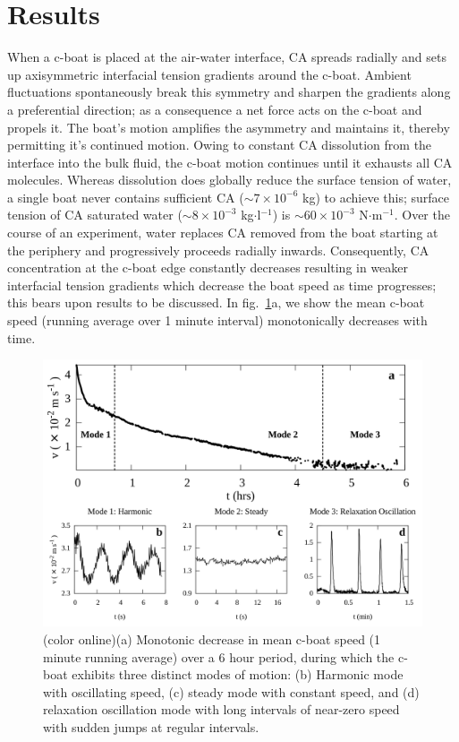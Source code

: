 \documentclass[journal=langd5, manuscript=article, layout=twocolumn]{achemso}
\begin{document}
\section{Results}
\label{resultsec}
When a c-boat is placed at the air-water interface, CA spreads radially and sets up axisymmetric interfacial tension gradients around the c-boat. Ambient fluctuations spontaneously break this symmetry and sharpen the gradients along a preferential direction; as a consequence a net force acts on the c-boat and propels it. The boat's motion amplifies the asymmetry and maintains it, thereby permitting it's continued motion. Owing to constant CA dissolution from the interface into the bulk fluid, the c-boat motion continues until it exhausts all CA molecules. Whereas dissolution does globally reduce the surface tension of water, a single boat never contains sufficient CA ($\sim 7 \times 10^{-6}$ kg) to achieve this; surface tension of CA saturated water ($\sim 8 \times 10^{-3}$ kg$\cdot$l$^{-1}$) is $\sim 60\times 10^{-3}$ N$\cdot$m$^{-1}$. Over the course of an experiment, water replaces CA removed from the boat starting at the periphery and progressively proceeds radially inwards. Consequently, CA concentration at the c-boat edge constantly decreases resulting in weaker interfacial tension gradients which decrease the boat speed as time progresses; this bears upon results to be discussed. In fig.~\ref{fig2}a, we show the mean c-boat speed (running average over 1 minute interval) monotonically decreases with time.

\begin{figure}[ht]
\centering
\includegraphics[width=0.85\linewidth]{figure2_v2.pdf}
\caption{(color online)(a) Monotonic decrease in mean c-boat speed (1 minute running average) over a 6 hour period, during which the c-boat exhibits three distinct modes of motion: (b) Harmonic mode with oscillating speed, (c) steady mode with constant speed, and (d) relaxation oscillation mode with long intervals of near-zero speed with sudden jumps at regular intervals.}
\label{fig2}
\end{figure}
\end{document}
